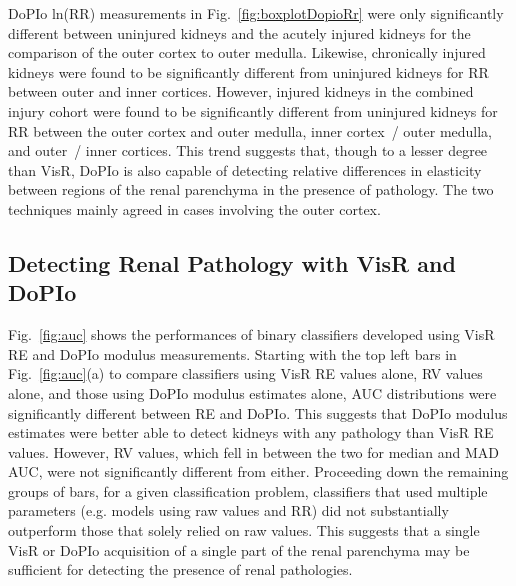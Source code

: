 DoPIo ln(RR) measurements in Fig.~\ref{fig:boxplotDopioRr} were only significantly different between uninjured kidneys and the acutely injured kidneys for the comparison of the outer cortex to outer medulla. Likewise, chronically injured kidneys were found to be significantly different from uninjured kidneys for RR between outer and inner cortices. However, injured kidneys in the combined injury cohort were found to be significantly different from uninjured kidneys for RR between the outer cortex and outer medulla, inner cortex~/ outer medulla, and outer~/ inner cortices. This trend suggests that, though to a lesser degree than VisR, DoPIo is also capable of detecting relative differences in elasticity between regions of the renal parenchyma in the presence of pathology. The two techniques mainly agreed in cases involving the outer cortex.

\subsection{Detecting Renal Pathology with VisR and DoPIo}

Fig.~\ref{fig:auc} shows the performances of binary classifiers developed using VisR RE and DoPIo modulus measurements. Starting with the top left bars in Fig.~\ref{fig:auc}(a) to compare classifiers using VisR RE values alone, RV values alone, and those using DoPIo modulus estimates alone, AUC distributions were significantly different between RE and DoPIo. This suggests that DoPIo modulus estimates were better able to detect kidneys with any pathology than VisR RE values. However, RV values, which fell in between the two for median and MAD AUC, were not significantly different from either. Proceeding down the remaining groups of bars, for a given classification problem, classifiers that used multiple parameters (e.g. models using raw values and RR) did not substantially outperform those that solely relied on raw values. This suggests that a single VisR or DoPIo acquisition of a single part of the renal parenchyma may be sufficient for detecting the presence of renal pathologies.

